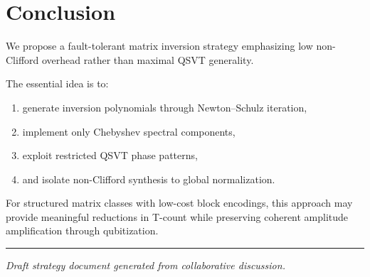 \documentclass[12pt,a4paper]{article}
\begin{document}

\section{Conclusion}

We propose a fault-tolerant matrix inversion strategy emphasizing low non-Clifford overhead rather than maximal QSVT generality.

The essential idea is to:

\begin{enumerate}
    \item generate inversion polynomials through Newton--Schulz iteration,
    \item implement only Chebyshev spectral components,
    \item exploit restricted QSVT phase patterns,
    \item and isolate non-Clifford synthesis to global normalization.
\end{enumerate}

For structured matrix classes with low-cost block encodings, this approach may provide meaningful reductions in T-count while preserving coherent amplitude amplification through qubitization.

\vspace{2em}

\hrule

\vspace{1em}

\noindent
\textit{
Draft strategy document generated from collaborative discussion.
}
\end{document}
